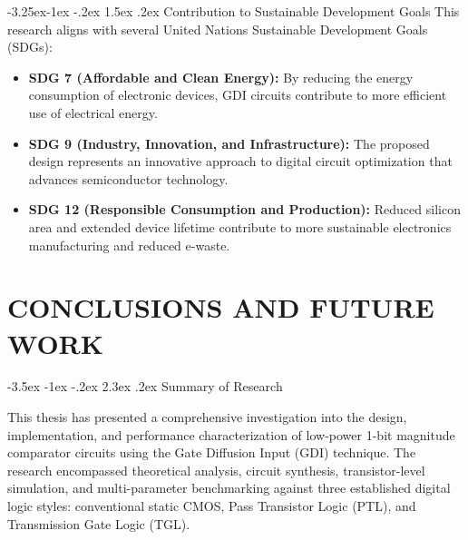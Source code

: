 \documentclass[12pt,a4paper,oneside]{report}
\makeatletter
\renewcommand\section{\@startsection {section}{1}{\z@}%
                                   {-3.5ex \@plus -1ex \@minus -.2ex}%
                                   {2.3ex \@plus.2ex}%
                                   {\normalfont\normalsize\bfseries}}
\renewcommand\subsection{\@startsection{subsection}{2}{\z@}%
                                     {-3.25ex\@plus -1ex \@minus -.2ex}%
                                     {1.5ex \@plus .2ex}%
                                     {\normalfont\normalsize\bfseries\itshape}}
\makeatother
\begin{document}
\subsection{Contribution to Sustainable Development Goals}
This research aligns with several United Nations Sustainable Development Goals (SDGs):
\begin{itemize}
\item \textbf{SDG 7 (Affordable and Clean Energy):} By reducing the energy consumption of electronic devices, GDI circuits contribute to more efficient use of electrical energy.
\item \textbf{SDG 9 (Industry, Innovation, and Infrastructure):} The proposed design represents an innovative approach to digital circuit optimization that advances semiconductor technology.
\item \textbf{SDG 12 (Responsible Consumption and Production):} Reduced silicon area and extended device lifetime contribute to more sustainable electronics manufacturing and reduced e-waste.
\end{itemize}


\chapter{CONCLUSIONS AND FUTURE WORK}

\section{Summary of Research}

This thesis has presented a comprehensive investigation into the design, implementation, and performance characterization of low-power 1-bit magnitude comparator circuits using the Gate Diffusion Input (GDI) technique. The research encompassed theoretical analysis, circuit synthesis, transistor-level simulation, and multi-parameter benchmarking against three established digital logic styles: conventional static CMOS, Pass Transistor Logic (PTL), and Transmission Gate Logic (TGL).
\end{document}
